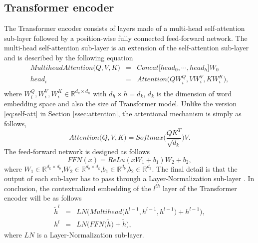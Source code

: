 \subsection{Transformer encoder}
\label{ssec:transformer-enc}
The Transformer encoder consists of layers made of a multi-head self-attention sub-layer followed by a position-wise fully connected feed-forward network. The multi-head self-attention sub-layer is an extension of the self-attention sub-layer and is described by the following equation
\begin{equation}
\begin{array}{rcl}
MultiheadAttention\big( Q,V,K \big) &=& Concat \big[ head_0, \cdots , head_h \big] W_0\\
head_i &=& Attention \big( QW_i^Q, VW_i^V, KW_i^K \big),\\
\end{array}
\end{equation}
where $W_i^Q, W_i^V, W_i^K \in \mathbb{R}^{d_k \times d_h}$ with $d_h \times h = d_k$, $d_k$ is the dimension of word embedding space and also the size of Transformer model. Unlike the version \eqref{eq:self-att} in Section \ref{ssec:attention}, the attentional mechanism is simply as follows,
\begin{equation}
Attention\big( Q, V, K \big) = Softmax\big(\frac{Q K^T}{\sqrt{d_k}} \big) V.
\end{equation}
The feed-forward network is designed as follows
\begin{equation}
FFN(x) = ReLu(xW_1+b_1)W_2+b_2,
\end{equation}
where $W_1 \in \mathbb{R}^{d_k \times d_b}$,$W_2 \in \mathbb{R}^{d_b \times d_k}$,$b_1 \in \mathbb{R}^{d_b}$,$b_2 \in \mathbb{R}^{d_k}$.
The final detail is that the output of each sub-layer has to pass through a Layer-Normalization sub-layer \citep{Jimmy16layer}. In conclusion, the contextualized embedding of the $l^{th}$ layer of the Transformer encoder will be as follows
\begin{equation}
\begin{array}{rcl}
\tilde{h}^l &=& LN\bigg(Multihead\big(h^{l-1}, h^{l-1}, h^{l-1}\big) + h^{l-1}\bigg), \\ 
h^l &=& LN\bigg(FFN\big(\tilde{h}\big) + \tilde{h}\bigg),
\end{array}
\label{eq:self-att}
\end{equation}
where $LN$ is a Layer-Normalization sub-layer.
